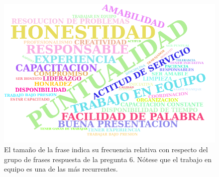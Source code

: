 \documentclass[paper=letter, fontsize=11pt]{scrartcl}
\numberwithin{equation}{section} %
\numberwithin{figure}{section} %
\numberwithin{table}{section} %
\begin{document}
\begin{figure}[H]
  \begin{center}
    \includegraphics[scale=.4]{vacantes_requeridas.png}
    \caption{ El tamaño de la frase indica su frecuencia relativa con respecto del grupo de frases respuesta de la pregunta 6. Nótese que el trabajo en equipo es una de las más recurrentes.}
    \label{figura1_5}
  \end{center}
\end{figure}
\end{document}

